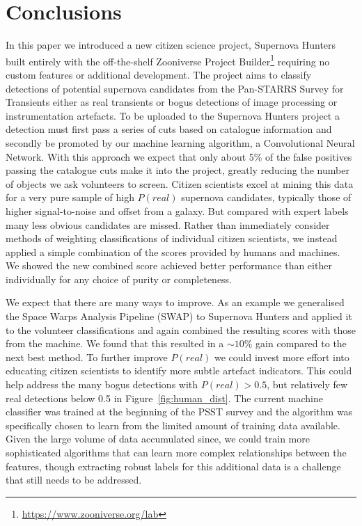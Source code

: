 \documentclass[a4paper,fleqn,usenatbib]{mnras}
\begin{document}
\section{Conclusions}
\label{sec:conclusions}

In this paper we introduced a new citizen science project, Supernova Hunters built entirely with the off-the-shelf Zooniverse Project Builder\footnote{\url{https://www.zooniverse.org/lab}} requiring no custom features or additional development.  The project aims to classify detections of potential supernova candidates from the Pan-STARRS Survey for Transients either as real transients or bogus detections of image processing or instrumentation artefacts.  To be uploaded to the Supernova Hunters project a detection must first pass a series of cuts based on catalogue information and secondly be promoted by our machine learning algorithm, a Convolutional Neural Network. With this approach we expect that only about 5\% of the false positives passing the catalogue cuts make it into the project, greatly reducing the number of objects we ask volunteers to screen.  Citizen scientists excel at mining this data for a very pure sample of high $P(real)$ supernova candidates, typically those of higher signal-to-noise and offset from a galaxy.  But compared with expert labels many less obvious candidates are missed.  Rather than immediately consider methods of weighting classifications of individual citizen scientists, we instead applied a simple combination of the scores provided by humans and machines.  We showed the new combined score achieved better performance than either individually for any choice of purity or completeness.

We expect that there are many ways to improve.  As an example we generalised the Space Warps Analysis Pipeline (SWAP) to Supernova Hunters and applied it to the volunteer classifications and again combined the resulting scores with those from the machine.  We found that this resulted in a $\sim10$\% gain compared to the next best method.  To further improve $P(real)$ we could invest more effort into educating citizen scientists to identify more subtle artefact indicators.  This could help address the many bogus detections with $P(real)>0.5$, but relatively few real detections below 0.5 in Figure~\ref{fig:human_dist}.  The current machine classifier was trained at the beginning of the PSST survey and the algorithm was specifically chosen to learn from the limited amount of training data available.  Given the large volume of data accumulated since, we could train more sophisticated algorithms that can learn more complex relationships between the features, though extracting robust labels for this additional data is a challenge that still needs to be addressed. 
\end{document}
